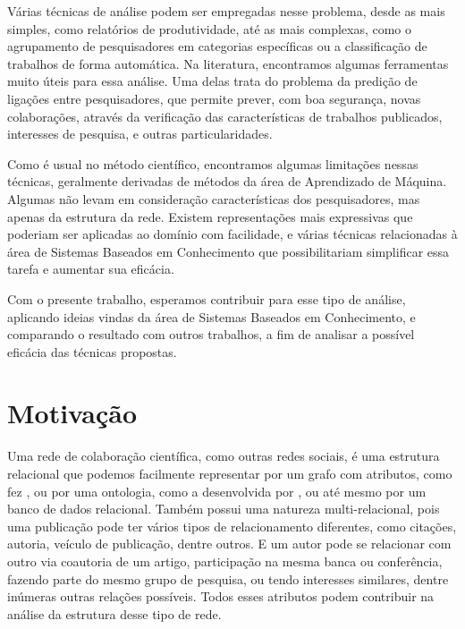 Várias técnicas de análise podem ser empregadas nesse problema, desde as mais simples, como relatórios de produtividade, até as mais complexas, como o agrupamento de pesquisadores em categorias específicas ou a classificação de trabalhos de forma automática. Na literatura, encontramos algumas ferramentas muito úteis para essa análise. Uma delas trata do problema da predição de ligações entre pesquisadores, que permite prever, com boa segurança, novas colaborações, através da verificação das características de trabalhos publicados, interesses de pesquisa, e outras particularidades.

Como é usual no método científico, encontramos algumas limitações nessas técnicas, geralmente derivadas de métodos da área de Aprendizado de Máquina. Algumas não levam em consideração características dos pesquisadores, mas apenas da estrutura da rede. Existem representações mais expressivas que poderiam ser aplicadas ao domínio com facilidade, e várias técnicas relacionadas à área de Sistemas Baseados em Conhecimento que possibilitariam simplificar essa tarefa e aumentar sua eficácia.


Com o presente trabalho, esperamos contribuir para esse tipo de análise, aplicando ideias vindas da área de Sistemas Baseados em Conhecimento, e comparando o resultado com outros trabalhos, a fim de analisar a possível eficácia das técnicas propostas.

\section{Motivação}
\label{sec:motivacao}

Uma rede de colaboração científica, como outras redes sociais, é uma estrutura relacional que podemos facilmente representar por um grafo com atributos, como fez \citet{Cervantes2014}, ou por uma ontologia, como a desenvolvida por \citet{Anaue2009}, ou até mesmo por um banco de dados relacional. Também possui uma natureza multi-relacional, pois uma publicação pode ter vários tipos de relacionamento diferentes, como citações, autoria, veículo de publicação, dentre outros. E um autor pode se relacionar com outro via coautoria de um artigo, participação na mesma banca ou conferência, fazendo parte do mesmo grupo de pesquisa, ou tendo interesses similares, dentre inúmeras outras relações possíveis. Todos esses atributos podem contribuir na análise da estrutura desse tipo de rede.

